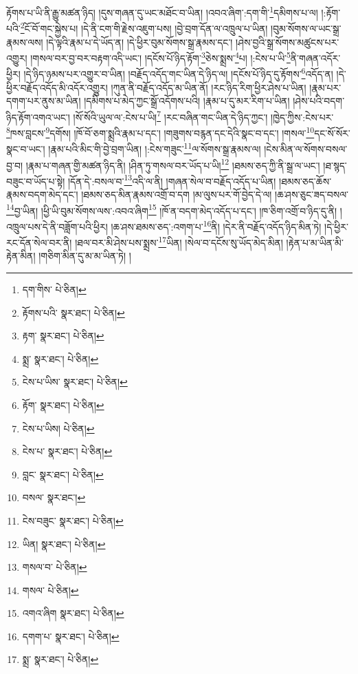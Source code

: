 རྟོགས་པ་ཡི་ནི་རྒྱུ་མཚན་ཉིད། །དུས་གཞན་དུ་ཡང་མཐོང་བ་ཡིན། །འབའ་ཞིག་:དག་གི་\footnote{དག་གིས་  པེ་ཅིན། }དམིགས་པ་ལ། །:རྟོག་པའི་\footnote{རྟོགས་པའི་  སྣར་ཐང་།  པེ་ཅིན། }ངོ་བོ་གང་སྐྱེས་པ། །དེ་ནི་ངག་གི་རྗེས་འཇུག་པས། །བྱེ་བྲག་དོན་ལ་འཁྲུལ་པ་ཡིན། །བུམ་སོགས་ལ་ཡང་སྒྲ་རྣམས་ལས། །དེ་ལྟའི་རྣམ་པ་དེ་ཡོད་ན། །དེ་ཕྱིར་བུམ་སོགས་སྒྲ་རྣམས་དང་། །ཤེས་བྱའི་སྒྲ་སོགས་མཚུངས་པར་འགྱུར། །གསལ་བར་བྱ་བར་བརྟག་འདི་ཡང་། །དངོས་པོ་ཉིད་རྟོག་\footnote{རྟག་  སྣར་ཐང་།  པེ་ཅིན། }ཅེས་སྨྲས་\footnote{སྨྲ་  སྣར་ཐང་།  པེ་ཅིན། }པ། །:ངེས་པ་ཡི་\footnote{ངེས་པ་ཡིས་  སྣར་ཐང་།  པེ་ཅིན། }ནི་གཞན་འདོར་ཕྱིར། །དེ་ཉིད་ཉམས་པར་འགྱུར་བ་ཡིན། །བརྗོད་འདོད་གང་ཡིན་དེ་ཉིད་ལ། །དངོས་པོ་ཉིད་དུ་རྟོགས་\footnote{རྟོག་  སྣར་ཐང་།  པེ་ཅིན། }འདོད་ན། །དེ་ཕྱིར་བརྗོད་འདོད་མི་འདོར་འགྱུར། །ཀུན་ནི་བརྗོད་འདོད་མ་ཡིན་ནོ། །རང་ཉིད་རིག་ཕྱིར་ཤེས་པ་ཡིན། །རྣམ་པར་དགག་པར་ནུས་མ་ཡིན། །དམིགས་པ་མེད་ཀྱང་སྒྲོ་འདོགས་པའི། །རྣམ་པ་དུ་མར་རིག་པ་ཡིན། །ཤེས་པའི་བདག་ཉིད་རྟོག་འགའ་ཡང་། །སོ་སོའི་ཡུལ་ལ་:ངེས་པ་ཡི།\footnote{ངེས་པ་ཡིས།  པེ་ཅིན། } །རང་བཞིན་གང་ཡིན་དེ་ཉིད་ཀྱང་། །ཁྱེད་ཀྱིས་:ངེས་པར་\footnote{ངེས་པ་  སྣར་ཐང་།  པེ་ཅིན། }ཁས་བླངས་\footnote{བླང་  སྣར་ཐང་།  པེ་ཅིན། }དགོས། །ཁོ་བོ་ཅག་སྨྲའི་རྣམ་པ་དང་། །གཟུགས་བརྙན་དང་དེའི་སྣང་བ་དང་། །གསལ་\footnote{བསལ་  སྣར་ཐང་། }དང་སོ་སོར་སྣང་བ་ཡང་། །རྣམ་པའི་མིང་གི་བྱེ་བྲག་ཡིན། །:ངེས་གཟུང་\footnote{ངེས་བཟུང་  སྣར་ཐང་།  པེ་ཅིན། }ལ་སོགས་སྒྲ་རྣམས་ལ། །ངེས་མིན་ལ་སོགས་བསལ་བྱ་བ། །རྣམ་པ་གཞན་གྱི་མཚན་ཉིད་ནི། །ཤིན་ཏུ་གསལ་བར་ཡོད་པ་ཡི།\footnote{ཡིན།  སྣར་ཐང་།  པེ་ཅིན། } །ཐམས་ཅད་ཀྱི་ནི་སྒྲ་ལ་ཡང་། །ཐ་སྙད་བཟུང་བ་ཡོད་པ་སྟེ། །དོན་དེ་:བསལ་བ་\footnote{གསལ་བ་  པེ་ཅིན། }འདི་ལ་ནི། །གཞན་སེལ་བ་བརྗོད་འདོད་པ་ཡིན། །ཐམས་ཅད་ཆོས་རྣམས་བདག་མེད་དང་། །ཐམས་ཅད་མིན་རྣམས་འགྲོ་བ་དག །མ་ལུས་པར་གོ་བྱེད་དེ་ལ། །ཆ་ཤས་ཅུང་ཟད་བསལ་\footnote{གསལ་  པེ་ཅིན། }བྱ་ཡིན། །ཕྱི་ཡི་བུམ་སོགས་ལས་:འབའ་ཞིག\footnote{འགའ་ཞིག  སྣར་ཐང་།  པེ་ཅིན། } །ཁོ་ན་བདག་མེད་འདོད་པ་དང་། །ཁ་ཅིག་འགྲོ་བ་ཉིད་དུ་ནི། །འཁྲུལ་པས་དེ་ནི་བཟློག་པའི་ཕྱིར། །ཆ་ཤས་ཐམས་ཅད་:འགག་པ་\footnote{དགག་པ་  སྣར་ཐང་།  པེ་ཅིན། }ནི། །དེར་ནི་བརྗོད་འདོད་ཉིད་མིན་ཏེ། །དེ་ཕྱིར་རང་དོན་སེལ་བར་ནི། །ཐལ་བར་མི་ཤེས་པས་སྨྲས་\footnote{སྨྲ་  སྣར་ཐང་།  པེ་ཅིན། }ཡིན། །སེལ་བ་དངོས་སུ་ཡོད་མེད་མིན། །རྟེན་པ་མ་ཡིན་མི་རྟེན་མིན། །གཅིག་མིན་དུ་མ་མ་ཡིན་ཏེ། །
